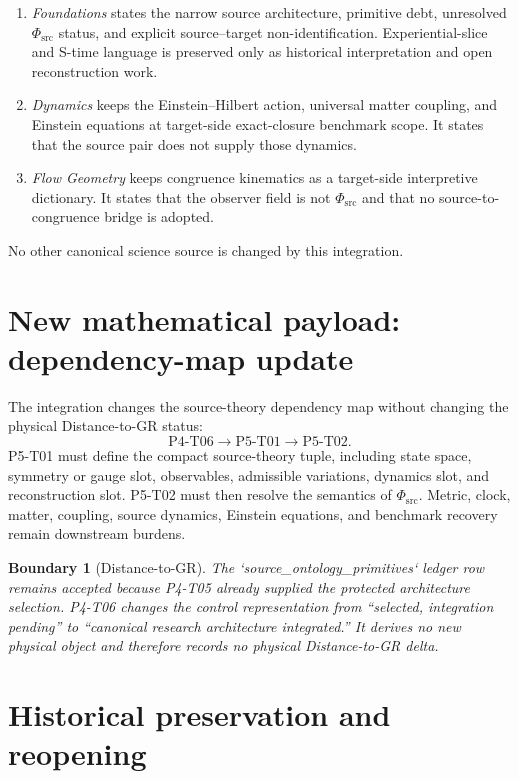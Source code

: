 \documentclass[11pt]{article}
\newcommand{\PhiSrc}{\Phi_{\mathrm{src}}}
\newtheorem{boundary}{Boundary}
\begin{document}
\begin{enumerate}[label=(\roman*)]
  \item \emph{Foundations} states the narrow source architecture, primitive
  debt, unresolved \(\PhiSrc\) status, and explicit source--target
  non-identification. Experiential-slice and S-time language is preserved only
  as historical interpretation and open reconstruction work.
  \item \emph{Dynamics} keeps the Einstein--Hilbert action, universal matter
  coupling, and Einstein equations at target-side exact-closure benchmark
  scope. It states that the source pair does not supply those dynamics.
  \item \emph{Flow Geometry} keeps congruence kinematics as a target-side
  interpretive dictionary. It states that the observer field is not
  \(\PhiSrc\) and that no source-to-congruence bridge is adopted.
\end{enumerate}

No other canonical science source is changed by this integration.

\section{New mathematical payload: dependency-map update}

The integration changes the source-theory dependency map without changing the
physical Distance-to-GR status:
\[
  \mathrm{P4\mbox{-}T06}
  \longrightarrow
  \mathrm{P5\mbox{-}T01}
  \longrightarrow
  \mathrm{P5\mbox{-}T02}.
\]
P5-T01 must define the compact source-theory tuple, including state space,
symmetry or gauge slot, observables, admissible variations, dynamics slot, and
reconstruction slot. P5-T02 must then resolve the semantics of
\(\PhiSrc\). Metric, clock, matter, coupling, source dynamics, Einstein
equations, and benchmark recovery remain downstream burdens.

\begin{boundary}[Distance-to-GR]
The `source\_ontology\_primitives` ledger row remains accepted because P4-T05
already supplied the protected architecture selection. P4-T06 changes the
control representation from ``selected, integration pending'' to
``canonical research architecture integrated.'' It derives no new physical
object and therefore records no physical Distance-to-GR delta.
\end{boundary}

\section{Historical preservation and reopening}
\end{document}
